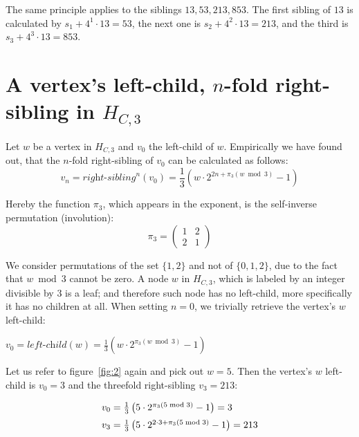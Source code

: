 The same principle applies to the siblings $13,53,213,853$. The first sibling of $13$ is calculated by $s_1+4^1\cdot13=53$, the next one is $s_2+4^2\cdot13=213$, and the third is $s_3+4^3\cdot13=853$.

\section{\texorpdfstring{A vertex's left-child, $n$-fold right-sibling in $H_{C,3}$}{A vertex's left-child, n-fold right-sibling in HC3}}
\label{sec:left_child_right_sibling_3}

Let $w$ be a vertex in $H_{C,3}$ and $v_0$ the left-child of $w$. Empirically we have found out, that the $n$-fold right-sibling of $v_0$ can be calculated as follows:
\begin{equation}
\label{eq:nfold_right_sibling_3}
	v_n=\textit{right-sibling}^n(v_0)=\frac{1}{3}\left(w\cdot2^{2n+\pi_3(w\bmod 3)}-1\right)
\end{equation}

Hereby the function $\pi_3$, which appears in the exponent, is the self-inverse permutation (involution):
\begin{equation}
\label{eq:pi_3}
	\pi_3=\left(\begin{array}{cc}
	1 & 2\\
	2 & 1
	\end{array}\right)
\end{equation}

We consider permutations of the set $\{1,2\}$ and not of $\{0,1,2\}$, due to the fact that $w\bmod 3$ cannot be zero. A node $w$ in $H_{C,3}$, which is labeled by an integer divisible by $3$ is a leaf; and therefore such node has no left-child, more specifically it has no children at all. When setting $n=0$, we trivially retrieve the vertex's $w$ left-child:
\begin{center}
	$v_0=\textit{left-child}(w)=\frac{1}{3}\left(w\cdot2^{\pi_3(w\bmod 3)}-1\right)$
\end{center}

\begin{example}
\label{ex:siblings}
Let us refer to figure~\ref{fig:2} again and pick out $w=5$. Then the	vertex's $w$ left-child is $v_0=3$ and the threefold right-sibling
$v_3=213$:

\begin{equation*}
\begin{array}{l}
	v_0=\frac{1}{3}\left(5\cdot2^{\pi_3(5\bmod 3)}-1\right)=3
	\\[\medskipamount]
	v_3=\frac{1}{3}\left(5\cdot2^{2\cdot3+\pi_3(5\bmod 3)}-1\right)=213
\end{array}
\end{equation*}
\end{example}

